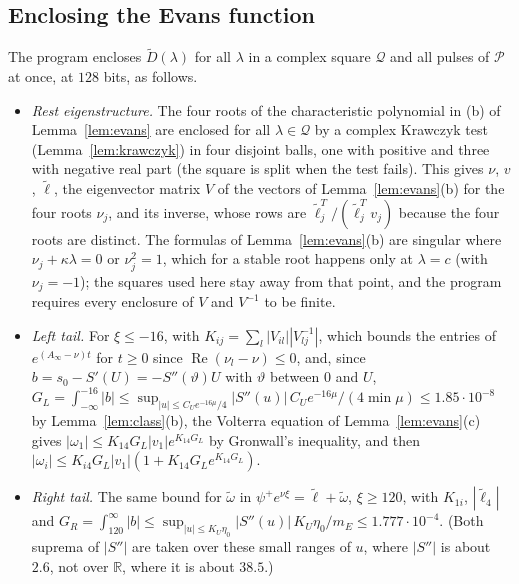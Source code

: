 \documentclass[11pt]{article}
\theoremstyle{definition}
\newcommand{\R}{\mathbb{R}}
\newcommand{\re}{\operatorname{Re}}
\newcommand{\Pcl}{\mathcal{P}}
\begin{document}
\subsection{Enclosing the Evans function}

The program  encloses $\tilde D(\lambda)$ for all $\lambda$ in a complex square $\mathcal{Q}$ and all pulses of $\Pcl$ at once, at $128$ bits, as follows.
\begin{itemize}
\item \emph{Rest eigenstructure.} The four roots of the characteristic polynomial in (b) of Lemma~\ref{lem:evans} are enclosed for all $\lambda \in \mathcal{Q}$ by a complex Krawczyk test (Lemma~\ref{lem:krawczyk}) in four disjoint balls, one with positive and three with negative real part (the square is split when the test fails). This gives $\nu$, $v$, $\tilde\ell$, the eigenvector matrix $V$ of the vectors of Lemma~\ref{lem:evans}(b) for the four roots $\nu_j$, and its inverse, whose rows are $\tilde\ell_j^T/(\tilde\ell_j^Tv_j)$ because the four roots are distinct. The formulas of Lemma~\ref{lem:evans}(b) are singular where $\nu_j + \kappa\lambda = 0$ or $\nu_j^2 = 1$, which for a stable root happens only at $\lambda = c$ (with $\nu_j = -1$); the squares used here stay away from that point, and the program requires every enclosure of $V$ and $V^{-1}$ to be finite.
\item \emph{Left tail.} For $\xi \le -16$, with $K_{ij} = \sum_l|V_{il}||V^{-1}_{lj}|$, which bounds the entries of $e^{(A_\infty - \nu)t}$ for $t \ge 0$ since $\re(\nu_l - \nu) \le 0$, and, since $b = s_0 - S'(U) = -S''(\vartheta)U$ with $\vartheta$ between $0$ and $U$, $G_L = \int_{-\infty}^{-16}|b| \le \sup_{|u| \le C_Ue^{-16\mu}/4}|S''(u)|\,C_Ue^{-16\mu}/(4\min\mu) \le 1.85\cdot 10^{-8}$ by Lemma~\ref{lem:class}(b), the Volterra equation of Lemma~\ref{lem:evans}(c) gives $|\omega_1| \le K_{14}G_L|v_1|e^{K_{14}G_L}$ by Gronwall's inequality, and then $|\omega_i| \le K_{i4}G_L|v_1|(1 + K_{14}G_Le^{K_{14}G_L})$.
\item \emph{Right tail.} The same bound for $\tilde\omega$ in $\psi^+e^{\nu\xi} = \tilde\ell + \tilde\omega$, $\xi \ge 120$, with $K_{1i}$, $|\tilde\ell_4|$ and $G_R = \int_{120}^\infty|b| \le \sup_{|u| \le K_U\eta_0}|S''(u)|\,K_U\eta_0/m_E \le 1.777\cdot 10^{-4}$. (Both suprema of $|S''|$ are taken over these small ranges of $u$, where $|S''|$ is about $2.6$, not over $\R$, where it is about $38.5$.)

\end{itemize}
\end{document}
